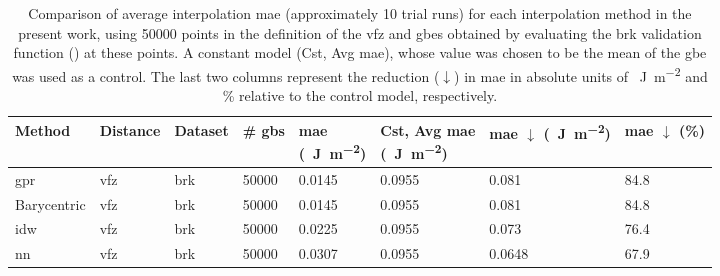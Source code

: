 \documentclass[final,twocolumn,12pt]{elsarticle}
\begin{document}
\begin{table}
\centering
\caption{Comparison of average interpolation \gls{mae} (approximately 10 trial runs) for each interpolation method in the present work, using \num{50000} points in the definition of the \gls{vfz} and \glspl{gbe} obtained by evaluating the \gls{brk} validation function (\cite{bulatovGrainBoundaryEnergy2014}) at these points. A constant model (Cst, Avg \gls{mae}), whose value was chosen to be the mean of the \inpt{} \gls{gbe} was used as a control. The last two columns represent the reduction ($\downarrow$) in \gls{mae} in absolute units of \SI{}{\J\per\square\meter} and \% relative to the control model, respectively.}
\label{tab:mae-error-comparison}
\begin{tabular}{@{}llllllll@{}}
\toprule
Method &
  Distance &
  Dataset &
  \# \glspl{gb} &
  \thead{\gls{mae} \\   (\SI{}{\J\per\square\meter})} &
  \thead{Cst, Avg \gls{mae} \\   (\SI{}{\J\per\square\meter})} &
  \thead{\gls{mae} $\downarrow$ \\   (\SI{}{\J\per\square\meter})} &
  \thead{\gls{mae}   $\downarrow$ \\ (\%)} \\ \midrule
\gls{gpr}   & \acrshort{vfz} & \acrshort{brk} & \num{50000} & \num{0.0145} & \num{0.0955} & \num{0.081}  & \num{84.8} \\
Barycentric & \acrshort{vfz} & \acrshort{brk} & \num{50000} & \num{0.0145} & \num{0.0955} & \num{0.081}  & \num{84.8} \\
\gls{idw}   & \acrshort{vfz} & \acrshort{brk} & \num{50000} & \num{0.0225} & \num{0.0955} & \num{0.073}  & \num{76.4} \\
\gls{nn}    & \acrshort{vfz} & \acrshort{brk} & \num{50000} & \num{0.0307} & \num{0.0955} & \num{0.0648} & \num{67.9} \\ \bottomrule
\end{tabular}
\end{table}
\end{document}
